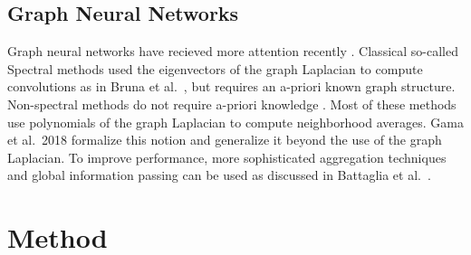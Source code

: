 \documentclass[10pt,twocolumn,letterpaper]{article}
\begin{document}
\subsection{Graph Neural Networks}
Graph neural networks have recieved more attention recently \cite{bronstein2017geometric, bruna2013spectral, defferrard2016convolutional, kipf2017semi, scarselli2009graph, gama2018mimo, gama2018convolutional, battaglia2018relational}.
Classical so-called Spectral methods used the eigenvectors of the graph Laplacian to compute convolutions as in Bruna et al.~\cite{bruna2013spectral}, but requires an a-priori known graph structure. 
Non-spectral methods do not require a-priori knowledge \cite{bronstein2017geometric, kipf2017semi, scarselli2009graph, gama2018convolutional}.
Most of these methods use polynomials of the graph Laplacian to compute neighborhood averages.
Gama et al.~2018 \cite{gama2018mimo, gama2018convolutional} formalize this notion and generalize it beyond the use of the graph Laplacian.
To improve performance, more sophisticated aggregation techniques and global information passing can be used as discussed in Battaglia et al.~\cite{battaglia2018relational}.

\section{Method}
\end{document}
